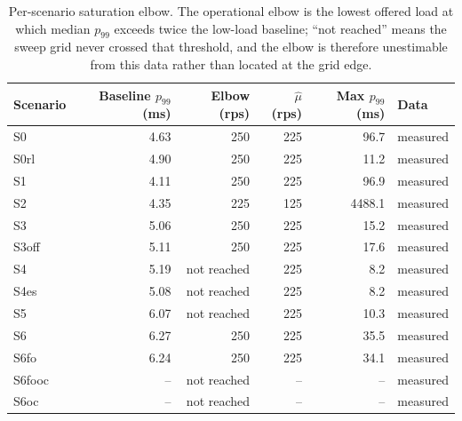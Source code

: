\begin{table}[t]
\centering
\caption{Per-scenario saturation elbow. The operational elbow is the lowest offered load at which median $p_{99}$ exceeds twice the low-load baseline; ``not reached'' means the sweep grid never crossed that threshold, and the elbow is therefore unestimable from this data rather than located at the grid edge.}
\label{tab:elbow}
\small
\begin{tabular}{lrrrrl}
\toprule
Scenario & Baseline $p_{99}$ (ms) & Elbow (rps) & $\hat{\mu}$ (rps) & Max $p_{99}$ (ms) & Data \\
\midrule
S0 & 4.63 & 250 & 225 & 96.7 & measured \\
S0rl & 4.90 & 250 & 225 & 11.2 & measured \\
S1 & 4.11 & 250 & 225 & 96.9 & measured \\
S2 & 4.35 & 225 & 125 & 4488.1 & measured \\
S3 & 5.06 & 250 & 225 & 15.2 & measured \\
S3off & 5.11 & 250 & 225 & 17.6 & measured \\
S4 & 5.19 & not reached & 225 & 8.2 & measured \\
S4es & 5.08 & not reached & 225 & 8.2 & measured \\
S5 & 6.07 & not reached & 225 & 10.3 & measured \\
S6 & 6.27 & 250 & 225 & 35.5 & measured \\
S6fo & 6.24 & 250 & 225 & 34.1 & measured \\
S6fooc & -- & not reached & -- & -- & measured \\
S6oc & -- & not reached & -- & -- & measured \\
\bottomrule
\end{tabular}
\end{table}
